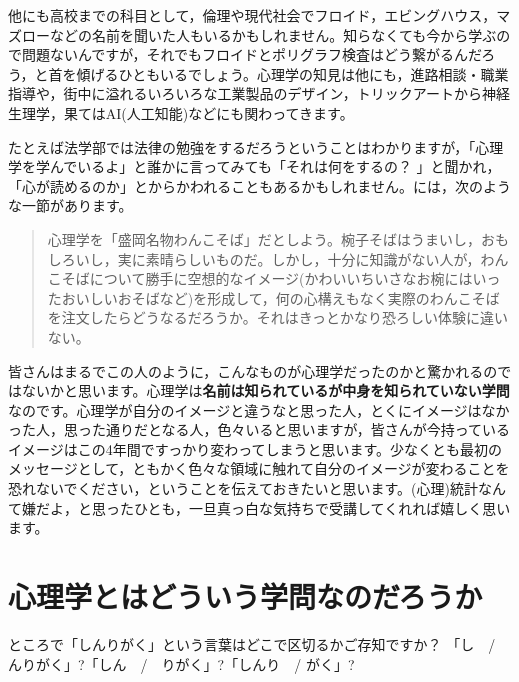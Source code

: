 \documentclass{book}
\begin{document}
他にも高校までの科目として，倫理や現代社会でフロイド，エビングハウス，マズローなどの名前を聞いた人もいるかもしれません。知らなくても今から学ぶので問題ないんですが，それでもフロイドとポリグラフ検査はどう繋がるんだろう，と首を傾げるひともいるでしょう。心理学の知見は他にも，進路相談・職業指導や，街中に溢れるいろいろな工業製品のデザイン，トリックアートから神経生理学，果てはAI(人工知能)などにも関わってきます。

たとえば法学部では法律の勉強をするだろうということはわかりますが，「心理学を学んでいるよ」と誰かに言ってみても「それは何をするの？ 」と聞かれ，「心が読めるのか」とからかわれることもあるかもしれません。\citet{道又200903}には，次のような一節があります。

\begin{quote}
	心理学を「盛岡名物わんこそば」だとしよう。椀子そばはうまいし，おもしろいし，実に素晴らしいものだ。しかし，十分に知識がない人が，わんこそばについて勝手に空想的なイメージ(かわいいちいさなお椀にはいったおいしいおそばなど)を形成して，何の心構えもなく実際のわんこそばを注文したらどうなるだろうか。それはきっとかなり恐ろしい体験に違いない。
\end{quote}

皆さんはまるでこの人のように，こんなものが心理学だったのかと驚かれるのではないかと思います。心理学は\textbf{名前は知られているが中身を知られていない学問}なのです。心理学が自分のイメージと違うなと思った人，とくにイメージはなかった人，思った通りだとなる人，色々いると思いますが，皆さんが今持っているイメージはこの4年間ですっかり変わってしまうと思います。少なくとも最初のメッセージとして，ともかく色々な領域に触れて自分のイメージが変わることを恐れないでください，ということを伝えておきたいと思います。(心理)統計なんて嫌だよ，と思ったひとも，一旦真っ白な気持ちで受講してくれれば嬉しく思います。

\section{心理学とはどういう学問なのだろうか}

ところで「しんりがく」という言葉はどこで区切るかご存知ですか？ 「し　/ んりがく」?「しん　/　りがく」?「しんり　/ がく」?
\end{document}
